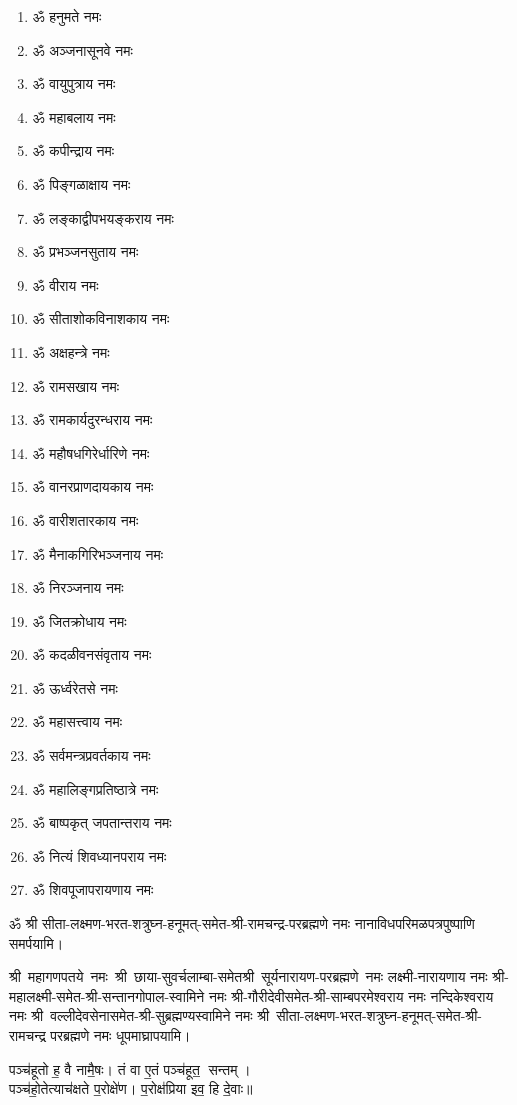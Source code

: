 \begin{center}
\begin{enumerate}
\item ॐ हनुमते नमः
\item ॐ अञ्जनासूनवे नमः
\item ॐ वायुपुत्राय नमः
\item ॐ महाबलाय नमः
\item ॐ कपीन्द्राय नमः
\item ॐ पिङ्गळाक्षाय नमः
\item ॐ लङ्काद्वीपभयङ्कराय नमः
\item ॐ प्रभञ्जनसुताय नमः
\item ॐ वीराय नमः
\item ॐ सीताशोकविनाशकाय नमः
\item ॐ अक्षहन्त्रे नमः
\item ॐ रामसखाय नमः
\item ॐ रामकार्यदुरन्धराय नमः
\item ॐ महौषधगिरेर्धारिणे नमः
\item ॐ वानरप्राणदायकाय नमः
\item ॐ वारीशतारकाय नमः
\item ॐ मैनाकगिरिभञ्जनाय नमः
\item ॐ निरञ्जनाय नमः
\item ॐ जितक्रोधाय नमः
\item ॐ कदळीवनसंवृताय नमः
\item ॐ ऊर्ध्वरेतसे नमः
\item ॐ महासत्त्वाय नमः
\item ॐ सर्वमन्त्रप्रवर्तकाय नमः
\item ॐ महालिङ्गप्रतिष्ठात्रे नमः
\item ॐ बाष्पकृत् जपतान्तराय नमः
\item ॐ नित्यं शिवध्यानपराय नमः
\item ॐ शिवपूजापरायणाय नमः
\end{enumerate}

ॐ श्री सीता-लक्ष्मण-भरत-शत्रुघ्न-हनूमत्-समेत-श्री-रामचन्द्र-परब्रह्मणे नमः नानाविधपरिमळपत्रपुष्पाणि समर्पयामि। \medskip

\newcommand{\swamine}{श्री~महागणपतये~नमः~श्री~छाया-सुवर्चलाम्बा-समेत\-श्री~सूर्यनारायण-परब्रह्मणे~नमः लक्ष्मी-नारायणाय नमः श्री-महालक्ष्मी-समेत-श्री-सन्तानगोपाल-स्वामिने नमः श्री-गौरीदेवीसमेत-श्री-साम्बपरमेश्वराय नमः नन्दिकेश्वराय नमः श्री~वल्लीदेवसेनासमेत-श्री-सुब्रह्मण्यस्वामिने नमः श्री~सीता-लक्ष्मण-भरत-शत्रुघ्न-हनूमत्-समेत-श्री-रामचन्द्र परब्रह्मणे नमः}
\swamine{} धूपमाघ्रापयामि।\medskip

पञ्च॑हूतो ह॒ वै नामै॒षः। तं वा ए॒तं पञ्च॑हूत॒ सन्तम्।\\
पञ्च॑हो॒तेत्याच॑क्षते प॒रोक्षे॑ण। प॒रोक्ष॑प्रिया इव॒ हि दे॒वाः॥


\end{center}
